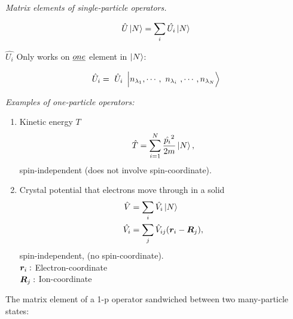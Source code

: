\noindent \emph{Matrix elements of single-particle operators.}



\begin{equation*}
	\hat{U} \ket{N}= \sum_i \hat{U_i} \ket{N}
\end{equation*}

$\hat{U_i}$ Only works on $\emph{one}$ element in $\ket{N}$:




	

\begin{equation*}
	\hat{U}_i = \tikzmark{node1}{\hat{U}_i}\ket{n_{\lambda_1},\cdots, \tikzmark[black]{node2}{n_{\lambda_i}}, \cdots, n_{\lambda_N}} 
\end{equation*}
\linebreak


\noindent \emph{Examples of one-particle operators:}

\begin{enumerate}
	\item
		Kinetic energy $T$
		\begin{equation}
			\hat{T}= \sum_{i=1}^{N} \frac{\hat{p_i}^2}{2m} \ket{N},
		\end{equation}
		spin-independent (does not involve spin-coordinate).
	\item
		Crystal potential that electrons move through in a solid
		\begin{align}
			\hat{V} &= \sum_i \hat{V_i} \ket{N}\\
			\hat{V_i} &= \sum_j \hat{V}_{ij} (\bm{r}_i-\bm{R}_j),
		\end{align}
		spin-independent, (no spin-coordinate).\\
		$\bm{r}_i:$ Electron-coordinate\\
		$\bm{R}_j:$ Ion-coordinate
\end{enumerate}

\noindent The matrix element of a 1-p operator sandwiched between two many-particle states:

